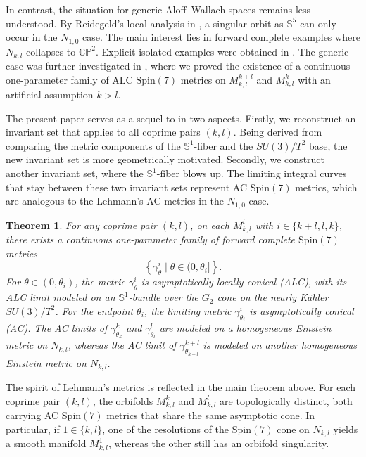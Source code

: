 \documentclass[11pt,letterpaper]{amsart}
\newtheorem{theorem}{Theorem}[section]
\theoremstyle{definition}
\numberwithin{equation}{section}
\newcommand{\spin}{\mathrm{Spin}}
\begin{document}
In contrast, the situation for generic Aloff--Wallach spaces remains less understood. By Reidegeld’s local analysis in \cite{reidegeld2011exceptional}, a singular orbit as $\mathbb{S}^5$ can only occur in the $N_{1,0}$ case. The main interest lies in forward complete examples where $N_{k,l}$ collapses to $\mathbb{CP}^2$. Explicit isolated examples were obtained in \cite{cvetic_cohomogeneity_2002, kanno_spin7_2002-1}. The generic case was further investigated in \cite{chi2022spin}, where we proved the existence of a continuous one-parameter family of ALC $\spin(7)$ metrics on $ M_{k,l}^{k+l}$ and $ M_{k,l}^{k}$ with an artificial assumption $k> l$.

The present paper serves as a sequel to \cite{chi2022spin} in two aspects. Firstly, we reconstruct an invariant set that applies to all coprime pairs $(k,l)$. Being derived from comparing the metric components of the $\mathbb{S}^1$-fiber and the $SU(3)/T^2$ base, the new invariant set is more geometrically motivated. Secondly, we construct another invariant set, where the $\mathbb{S}^1$-fiber blows up. The limiting integral curves that stay between these two invariant sets represent AC $\spin(7)$ metrics, which are analogous to the Lehmann's AC metrics in the $N_{1,0}$ case. 

\begin{theorem}
\label{thm: main 1}
For any coprime pair $(k,l)$, on each $M_{k,l}^{i}$ with $i\in \{k+l,l,k\}$, there exists a continuous one-parameter family of forward complete 
$\spin(7)$ metrics $$\left\{\gamma^i_{\theta}\mid \theta\in (0,\theta_i]\right\}.$$
For $\theta\in(0,\theta_i)$, the metric $\gamma^i_{\theta}$ is asymptotically locally conical (ALC), with its ALC limit modeled on an $ \mathbb{S}^1 $-bundle over the $G_2$ cone on the nearly K\"ahler $ SU(3)/T^2$. For the endpoint $\theta_i$, the limiting metric $\gamma^i_{\theta_i}$ is asymptotically conical (AC). The AC limits of $\gamma^k_{\theta_k}$ and  $\gamma^l_{\theta_l}$ are modeled on a homogeneous Einstein metric on $N_{k,l}$, whereas the AC limit of $\gamma^{k+l}_{\theta_{k+l}}$ is modeled on another homogeneous Einstein metric on $N_{k,l}$.
\end{theorem}

The spirit of Lehmann’s metrics is reflected in the main theorem above. For each coprime pair $(k,l)$, the orbifolds $M_{k,l}^k$ and $M_{k,l}^l$	are topologically distinct, both carrying AC $\spin(7)$ metrics that share the same asymptotic cone. In particular, if $1\in\{k,l\}$, one of the resolutions of the $\spin(7)$ cone on $N_{k,l}$ yields a smooth manifold $M_{k,l}^1$, whereas the other still has an orbifold singularity.
\end{document}
